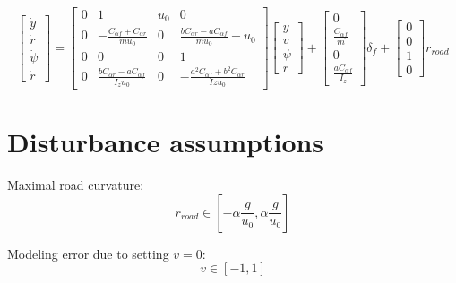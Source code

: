 \documentclass[letterpaper, 12pt]{article}
\begin{document}
\begin{equation}
	\begin{bmatrix}
		\dot y \\
		\dot r \\
		\dot \psi \\
		\dot r
	\end{bmatrix}
	= 
	\begin{bmatrix}
	0 & 1 & u_0 & 0 \\
    0 & -\frac{C_{\alpha f}+C_{\alpha r}}{m u_0}  & 0 & \frac{b C_{\alpha r}-a C_{\alpha f}}{m u_0} - u_0 \\
    0 & 0 & 0 & 1 \\
    0 & \frac{b C_{\alpha r}-a C_{\alpha f}}{I_z u_0} & 0 & - \frac{a^2   C_{\alpha f} + b^2   C_{\alpha r}}{Iz u_0}
	\end{bmatrix} 
	\begin{bmatrix}
		y \\
		v \\
		\psi \\
		r
	\end{bmatrix}
	+ 
	\begin{bmatrix}
		0 \\ \frac{C_{\alpha f}}{m} \\ 0 \\ \frac{a C_{\alpha f}}{I_z}
	\end{bmatrix}
	\delta_f
	+ \begin{bmatrix}
		0 \\
		0 \\
		1 \\
		0 
	\end{bmatrix} 
		r_{road} 
\end{equation}


\section{Disturbance assumptions} %
\label{sec:assumptions}

Maximal road curvature: 
\begin{equation}
	r_{road} \in [- \alpha \frac{g}{u_0}, \alpha \frac{g}{u_0}]
\end{equation}

Modeling error due to setting $v=0$:
\begin{equation}
	v \in [-1, 1]
\end{equation}

\end{document}
